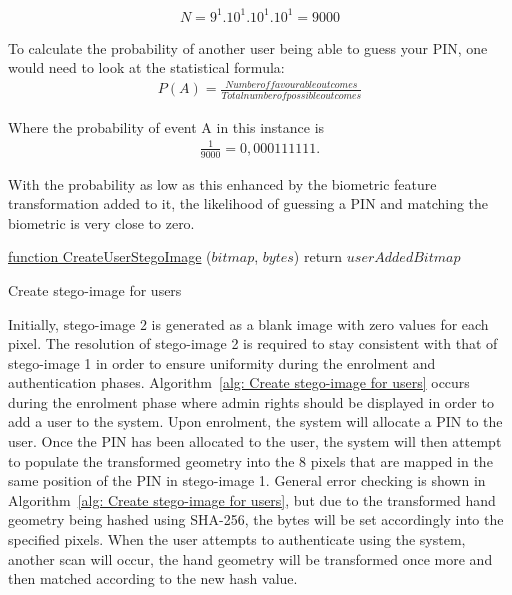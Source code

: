 \begin{gather}
    N = 9^{1}.10^{1}.10^{1}.10^{1} 
    = 9000    
\end{gather}



To calculate the probability of another user being able to guess your PIN, one would need to look at the statistical formula: 
\begin{gather}
    P (A) = \frac{Number of favourable outcomes}{Total number of possible outcomes}
\end{gather}


Where the probability of event A in this instance is 
\begin{gather}
    \frac{1}{9000} = 0,000111111.
\end{gather}

With the probability as low as this enhanced by the biometric feature transformation added to it, the likelihood of guessing a PIN and matching the biometric is very close to zero.


\begin{algorithm}
     \underline{function CreateUserStegoImage} ($bitmap$, $bytes$)\;
     return $userAddedBitmap$
     \caption{Create stego-image for users}
     \label{alg: Create stego-image for users}
     
\end{algorithm}


Initially, stego-image 2 is generated as a blank image with zero values for each pixel. The resolution of stego-image 2 is required to stay consistent with that of stego-image 1 in order to ensure uniformity during the enrolment and authentication phases. Algorithm~\ref{alg: Create stego-image for users} occurs during the enrolment phase where admin rights should be displayed in order to add a user to the system. Upon enrolment, the system will allocate a PIN to the user. Once the PIN has been allocated to the user, the system will then attempt to populate the transformed geometry into the 8 pixels that are mapped in the same position of the PIN in stego-image 1. General error checking is shown in Algorithm~\ref{alg: Create stego-image for users}, but due to the transformed hand geometry being hashed using SHA-256, the bytes will be set accordingly into the specified pixels. When the user attempts to authenticate using the system, another scan will occur, the hand geometry will be transformed once more and then matched according to the new hash value.

